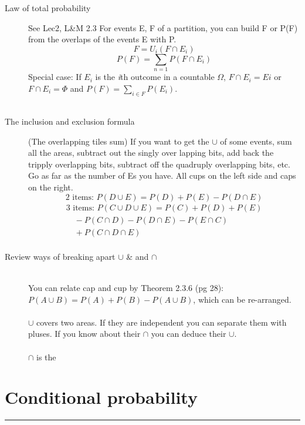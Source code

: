 \begin{description}
\item[Law of total probability] See Lec2, L\&M 2.3 \newline
For events E, F of a partition, you can build F or P(F) from the overlaps of the events E with P.
	\[ F = U_i(F \cap E_i)  \]
	\[ P(F) = \sum_{n=1} P(F \cap E_i) \]
Special case: If $E_i$ is the \textit{i}th outcome in a countable $\Omega$, $F \cap E_i = Ei$ 
or $F \cap E_i = \Phi$ and $P(F) = \sum_{i \in F} P(E_i)$.  \hfill \\
\hfill \\

\item[The inclusion and exclusion formula] (The overlapping tiles sum)
If you want to get the $\cup$ of some events, sum all the areas, subtract out the singly over lapping bits, add back the tripply overlapping bits, subtract off the quadruply overlapping bits, etc.  Go as far as the number of Es you have. 
All cups on the left side and caps on the right. 
	\[\mbox{2 items: } P(D \cup E) = P(D) + P(E) - P(D \cap E) \]
	\begin{align*}
	\mbox{3 items: }   
	P(C \cup D \cup E) = P(C) + P(D) + P(E) \\
	\quad - P(C \cap D) - P(D \cap E) - P(E \cap C) \\
	\quad + P(C \cap D \cap E) \\
	\end{align*}

\item[Review ways of breaking apart $\cup$ \& and $\cap$] \hfill \\

 You can relate cap and cup {\tiny by Theorem 2.3.6 (pg 28)}:
$P(A \cup B) = P(A) + P(B) - P(A \cup B)$, which can be re-arranged.  \hfill \\
\hfill \\
$\cup$ covers two areas.  If they are independent you can separate them with pluses.  If you know about their $\cap$ you can deduce their $\cup$.  \hfill \\
\hfill \\
$\cap$ is the

\end{description}

\section{Conditional probability}
\smallskip \hrule height 2pt \smallskip

